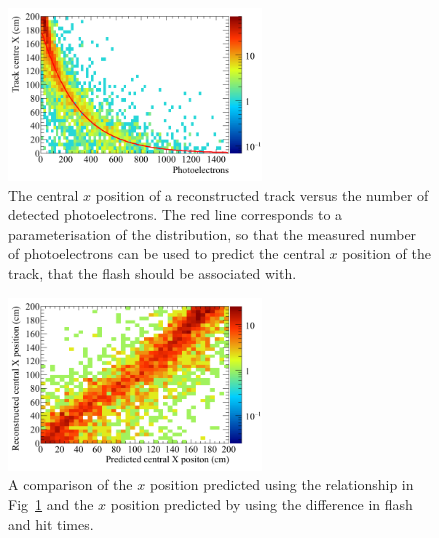 \begin{figure}[h!]
  \centering
  \includegraphics[width=0.6\textwidth]{NumPE_Distance}
  \caption[The central $x$ position of a reconstructed track versus the number of detected photoelectrons]
          {The central $x$ position of a reconstructed track versus the number of detected photoelectrons. The red line corresponds to a parameterisation of the distribution, so that the measured number of photoelectrons can be used to predict the central $x$ position of the track, that the flash should be associated with.}
  \label{fig:PD_PExPlot}
\end{figure}

\begin{figure}[h!]
  \centering
  \includegraphics[width=0.6\textwidth]{DiffFlashPredReco}
  \caption[The predicted $x$ positions of flashes using the relationship between photoelectron and drift distance]
          {A comparison of the $x$ position predicted using the relationship in Fig~\ref{fig:PD_PExPlot} and the $x$ position predicted by using the difference in flash and hit times.}
  \label{fig:PD_PEDiffX}
\end{figure}

